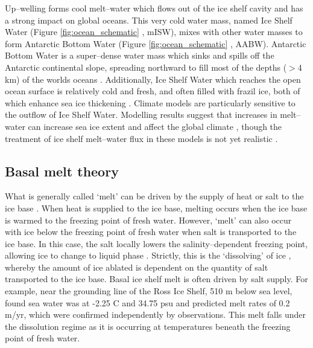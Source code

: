 Up--welling forms cool melt--water which flows out of the ice shelf cavity and has a strong impact on global oceans. This very cold water mass, named Ice Shelf Water (Figure {\ref{fig:ocean_schematic}
}, mISW),  mixes with other water masses to form Antarctic Bottom Water (Figure {\ref{fig:ocean_schematic}
}, AABW). Antarctic Bottom Water is a super--dense water mass which sinks and spills off the Antarctic continental slope, spreading northward to fill most of the depths ($>$4 km) of the worlds oceans \citep{orsi1999circulation}. 
Additionally, Ice Shelf Water which reaches the open ocean surface is relatively cold and fresh, and often filled with frazil ice, both of which enhance sea ice thickening \citep{langhorne2015observed}.
Climate models are particularly sensitive to the outflow of Ice Shelf Water. Modelling results suggest that increases in melt--water can increase sea ice extent and affect the global climate \citep[e.g][]{merino2018impact,golledge2019global,bronselaer2018change}, though the treatment of ice shelf melt--water flux in these models is not yet realistic \citep{jourdain2020protocol}.

\subsection{Basal melt theory} \label{basal_melt_theory}

What is generally called `melt' can be driven by the supply of heat or salt to the ice base \citep{wells2011melting}. When heat is supplied to the ice base, melting occurs when the ice base is warmed to the freezing point of fresh water. However, `melt' can also occur with ice below the freezing point of fresh water when salt is transported to the ice base. In this case, the salt locally lowers the salinity--dependent freezing point, allowing ice to change to liquid phase \citep[e.g.][]{mcphee1987dynamics}. Strictly, this is the `dissolving' of ice \citep[e.g][]{malyarenko2020synthesis}, whereby the amount of ice ablated is dependent on the quantity of salt transported to the ice base.
Basal ice shelf melt is often driven by salt supply. For example, near the grounding line of the Ross Ice Shelf, 510 m below sea level, \cite{robinson2020ice} found sea water was at -2.25 \textdegree C and 34.75 psu and predicted melt rates of 0.2 m/yr, which were confirmed independently by observations. This melt falls under the dissolution regime as it is occurring at temperatures beneath the freezing point of fresh water.

